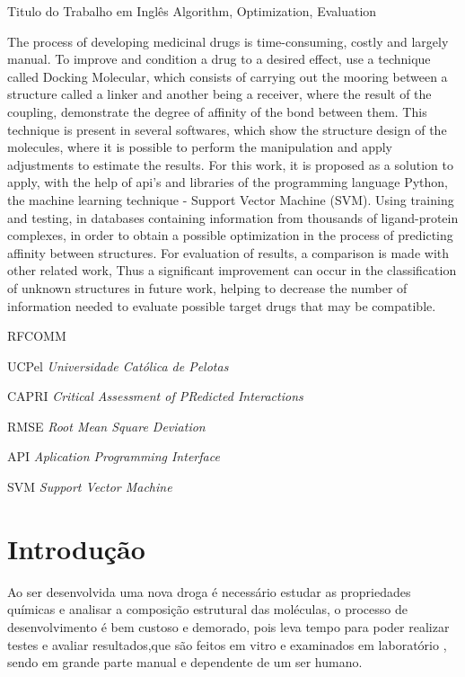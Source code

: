 \documentclass[tcc, capa]{texucpel}
\begin{document}
\begin{englishabstract}
  {Titulo do Trabalho em Inglês}
  {Algorithm, Optimization, Evaluation}  
  
The process of developing medicinal drugs is time-consuming, costly and largely manual.
To improve and condition a drug to a desired effect, use a technique called Docking Molecular, which consists of carrying out the mooring between a structure called a linker and another being a receiver, where the result of the coupling, demonstrate the degree of affinity of the bond between them.
This technique is present in several softwares, which show the structure design of the molecules, where it is possible to perform the manipulation and apply adjustments to estimate the results.
For this work, it is proposed as a solution to apply, with the help of api's and libraries of the programming language Python, the machine learning technique - Support Vector Machine (SVM). Using training and testing, in databases containing information from thousands of ligand-protein complexes, in order to obtain a possible optimization in the process of predicting affinity between structures.
For evaluation of results, a comparison is made with other related work,
Thus a significant improvement can occur in the classification of unknown structures in future work, helping to decrease the number of information needed to evaluate possible target drugs that may be compatible.

\end{englishabstract}

\listoffigures

\listoftables

\begin{listofabbrv}{RFCOMM}
		\item[UCPel] \textit{Universidade Cat\'olica de Pelotas}
        \item[CAPRI] \textit{Critical Assessment of PRedicted Interactions}
        \item[RMSE] \textit{Root Mean Square Deviation}
        \item[API] \textit{Aplication Programming Interface}
        \item[SVM] \textit{Support Vector Machine}

        
        
\end{listofabbrv}

\tableofcontents

\chapter{Introdução}
Ao ser desenvolvida uma nova droga é necessário estudar as propriedades químicas e analisar a composição estrutural das moléculas, o processo de desenvolvimento é bem custoso e demorado, pois leva tempo para poder realizar testes e avaliar resultados,que são feitos em vitro e examinados em laboratório \cite{prnasciutti2012}, sendo em grande parte manual e dependente de um ser humano.
\end{document}
